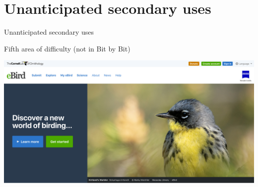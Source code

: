 \documentclass{beamer}
\begin{document}
\section{Unanticipated secondary uses}

\begin{frame}{Unanticipated secondary uses}

Fifth area of difficulty (not in Bit by Bit)

\includegraphics[width=\textwidth]{figures/ebird_screenshot.png}

\end{frame}
\end{document}
